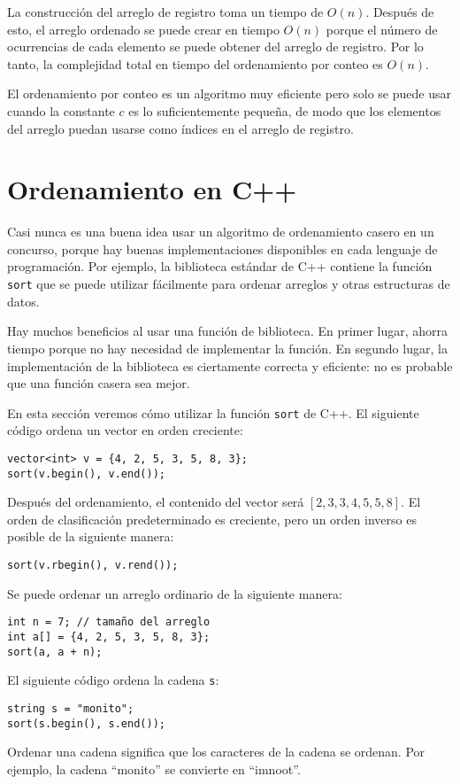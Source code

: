 La construcción del arreglo de registro
toma un tiempo de $O(n)$. Después de esto, el arreglo ordenado
se puede crear en tiempo $O(n)$ porque
el número de ocurrencias de cada elemento se puede obtener
del arreglo de registro.
Por lo tanto, la complejidad total en tiempo del
ordenamiento por conteo es $O(n)$.

El ordenamiento por conteo es un algoritmo muy eficiente
pero solo se puede usar cuando la constante $c$
es lo suficientemente pequeña, de modo que los elementos del arreglo puedan
usarse como índices en el arreglo de registro.

\section{Ordenamiento en C++}


Casi nunca es una buena idea usar
un algoritmo de ordenamiento casero
en un concurso, porque hay buenas
implementaciones disponibles en cada lenguaje de programación.
Por ejemplo, la biblioteca estándar de C++ contiene
la función \texttt{sort} que se puede utilizar fácilmente para
ordenar arreglos y otras estructuras de datos.

Hay muchos beneficios al usar una función de biblioteca.
En primer lugar, ahorra tiempo porque no hay necesidad de
implementar la función.
En segundo lugar, la implementación de la biblioteca es
ciertamente correcta y eficiente: no es probable
que una función casera sea mejor.

En esta sección veremos cómo utilizar la
función \texttt{sort} de C++.
El siguiente código ordena
un vector en orden creciente:
\begin{lstlisting}
vector<int> v = {4, 2, 5, 3, 5, 8, 3};
sort(v.begin(), v.end());
\end{lstlisting}
Después del ordenamiento, el contenido del
vector será
$[2,3,3,4,5,5,8]$.
El orden de clasificación predeterminado es creciente,
pero un orden inverso es posible de la siguiente manera:
\begin{lstlisting}
sort(v.rbegin(), v.rend());
\end{lstlisting}

Se puede ordenar un arreglo ordinario de la siguiente manera:
\begin{lstlisting}
int n = 7; // tamaño del arreglo
int a[] = {4, 2, 5, 3, 5, 8, 3};
sort(a, a + n);
\end{lstlisting}

\noindent
El siguiente código ordena la cadena \texttt{s}:
\begin{lstlisting}
string s = "monito";
sort(s.begin(), s.end());
\end{lstlisting}
Ordenar una cadena significa que los caracteres
de la cadena se ordenan.
Por ejemplo, la cadena ``monito'' se convierte en ``imnoot''.

